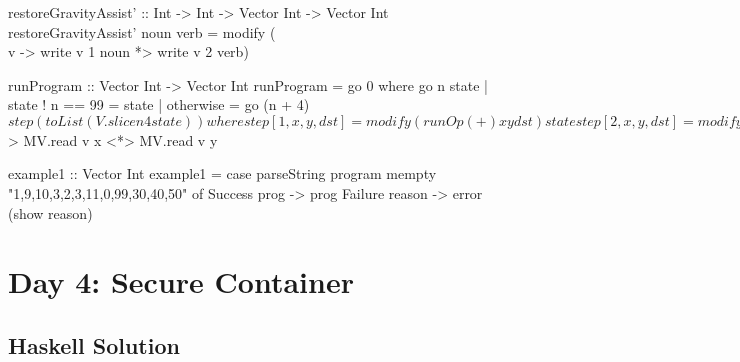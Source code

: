 \nwendcode{}\nwdocspar

\nwenddocs{}\plusendmoddef\nwstartdeflinemarkup{}\nwenddeflinemarkup
restoreGravityAssist' :: Int -> Int -> Vector Int -> Vector Int
restoreGravityAssist' noun verb =
    modify (\\v -> write v 1 noun *> write v 2 verb)


\nwendcode{}\nwdocspar

\nwenddocs{}\plusendmoddef\nwstartdeflinemarkup{}\nwenddeflinemarkup
runProgram :: Vector Int -> Vector Int
runProgram = go 0
  where
    go n state
      | state ! n == 99 = state
      | otherwise       = go (n + 4) $ step (toList (V.slice n 4 state))
      where
        step [1, x, y, dst] = modify (runOp (+) x y dst) state
        step [2, x, y, dst] = modify (runOp (*) x y dst) state
        step _              = state

    runOp f x y dst v = write v dst =<< f <$> MV.read v x <*> MV.read v y


\nwendcode{}\nwdocspar

\nwenddocs{}\plusendmoddef\nwstartdeflinemarkup{}\nwenddeflinemarkup
example1 :: Vector Int
example1 =
    case parseString program mempty "1,9,10,3,2,3,11,0,99,30,40,50" of
      Success prog   -> prog
      Failure reason -> error (show reason)
\nwendcode{}\nwdocspar
\nwenddocs{}\newpage
\chapter{Day 4: Secure Container}
\nwenddocs{}\section{Haskell Solution}

